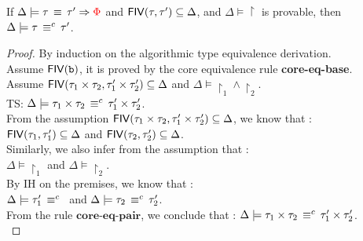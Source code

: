 \begin{thm}
 If $\Delta \models \tau \, \equiv \, \tau' \Rightarrow \textcolor{red} {\Phi}$ and $\mathsf{FIV} (\tau, \tau') \subseteq \Delta $, and $\Delta \models \restriction $ is provable, then $ \Delta \models \tau \, \equiv^c \, \tau' $.
\end{thm}
\begin{proof}
By induction on the algorithmic type equivalence derivation.\\
Assume $\mathsf{FIV} (\mathtt{b})$,
it is proved by the core equivalence rule \textbf{core-eq-base}.\\

  Assume $ \mathsf{FIV} (\tau_1 \times \tau_2, \tau_1' \times \tau_2') \subseteq \Delta $ and $\Delta \models \restriction_1 \land \restriction_2  $.\\
  TS: $\Delta \models \tau_1 \times \tau_2 \, \equiv^c \, \tau_1' \times \tau_2' $.\\
 From the assumption $ \mathsf{FIV} (\tau_1 \times \tau_2, \tau_1' \times \tau_2') \subseteq \Delta $, we know that :\\
 $ \mathsf{FIV} (\tau_1, \tau_1') \subseteq \Delta $ and $ \mathsf{FIV} (\tau_2, \tau_2') \subseteq \Delta $.\\
 Similarly, we also infer from the assumption that : \\
 $\Delta \models \restriction_1  $ and $\Delta \models \restriction_2 $. \\
 By IH on the premises, we know that : \\
 $\Delta \models \eqvc{\type_1'}$ and $\Delta \models \tau_2 \, \equiv^c \, \tau_2'$.\\
 From the rule $\textbf{core-eq-pair}$, we conclude that : $\Delta \models \tau_1 \times \tau_2 \, \equiv^c \, \tau_1' \times \tau_2' $.\\
 
    

\end{proof}
